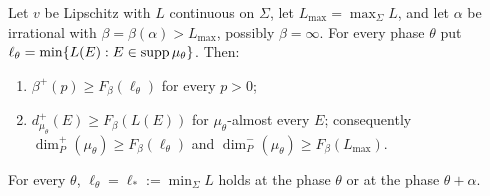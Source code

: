 \begin{theorem}\label{thm:U1}
Let $v$ be Lipschitz with $L$ continuous on $\Sigma$, let $L_{\max}=\max_\Sigma L$, and let $\alpha$ be irrational with $\beta=\beta(\alpha)>L_{\max}$, possibly $\beta=\infty$. For every phase $\theta$ put $\ell_\theta=\min\{L(E):E\in\operatorname{supp}\mu_\theta\}$. Then:
\begin{enumerate}
\item $\beta^+(p)\ge F_\beta(\ell_\theta)$ for every $p>0$;
\item $d^+_{\mu_\theta}(E)\ge F_\beta(L(E))$ for $\mu_\theta$-almost every $E$; consequently $\dim_P^+(\mu_\theta)\ge F_\beta(\ell_\theta)$ and $\dim_P^-(\mu_\theta)\ge F_\beta(L_{\max})$.
\end{enumerate}
For every $\theta$, $\ell_\theta=\ell_*:=\min_\Sigma L$ holds at the phase $\theta$ or at the phase $\theta+\alpha$.
\end{theorem}

